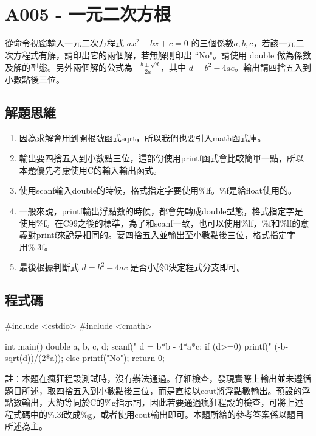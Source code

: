 \section{A005 - 一元二次方根}
從命令視窗輸入一元二次方程式 $ax^{2}+bx+c=0$ 的三個係數$a, b, c$，若該一元二次方程式有解，請印出它的兩個解，若無解則印出 ``No"。請使用 double 做為係數及解的型態。另外兩個解的公式為 $\displaystyle\frac{-b\pm\sqrt{d}}{2a}$，其中 $d=b^2-4ac$。輸出請四捨五入到小數點後三位。

\subsection{解題思維}
\begin{enumerate}
	\item 因為求解會用到開根號函式sqrt，所以我們也要引入math函式庫。
	\item 輸出要四捨五入到小數點三位，這部份使用printf函式會比較簡單一點，所以本題優先考慮使用C的輸入輸出函式。
	\item 使用scanf輸入double的時候，格式指定字要使用\%lf。\%f是給float使用的。
	\item 一般來說，printf輸出浮點數的時候，都會先轉成double型態，格式指定字是使用\%f。在C99之後的標準，為了和scanf一致，也可以使用\%lf，\%f和\%lf的意義對printf來說是相同的。要四捨五入並輸出至小數點後三位，格式指定字用\%.3f。
	\item 最後根據判斷式 $d=b^2-4ac$ 是否小於0決定程式分支即可。
\end{enumerate}

\subsection{程式碼}
\begin{cppcode}
	#include <cstdio>
	#include <cmath>
	
	int main()
	{
		double a, b, c, d;
		scanf("%
		d = b*b - 4*a*c;
		if (d>=0) {
			printf("%
					(-b-sqrt(d))/(2*a));
		} else printf("No");
		return 0;
	}
\end{cppcode}
註：本題在瘋狂程設測試時，沒有辦法通過。仔細檢查，發現實際上輸出並未遵循題目所述，取四捨五入到小數點後三位，而是直接以cout將浮點數輸出。\cc{}預設的浮點數輸出，大約等同於C的\%g指示詞，因此若要通過瘋狂程設的檢查，可將上述程式碼中的\%.3f改成\%g，或者使用cout輸出即可。本題所給的參考答案係以題目所述為主。
